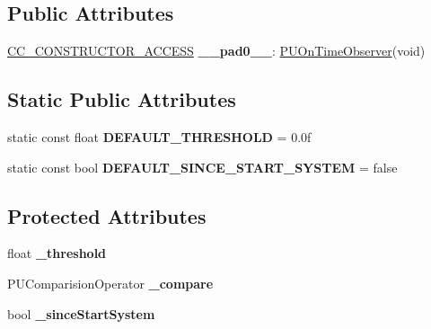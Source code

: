 \subsection*{Public Attributes}
\begin{DoxyCompactItemize}
\item 
\mbox{\label{classPUOnTimeObserver_add5834093bdb7d633b6e162e99235aff}} 
\hyperlink{_2cocos2d_2cocos_2base_2ccConfig_8h_a25ef1314f97c35a2ed3d029b0ead6da0}{C\+C\+\_\+\+C\+O\+N\+S\+T\+R\+U\+C\+T\+O\+R\+\_\+\+A\+C\+C\+E\+SS} {\bfseries \+\_\+\+\_\+pad0\+\_\+\+\_\+}\+: \hyperlink{classPUOnTimeObserver}{P\+U\+On\+Time\+Observer}(void)
\end{DoxyCompactItemize}
\subsection*{Static Public Attributes}
\begin{DoxyCompactItemize}
\item 
\mbox{\label{classPUOnTimeObserver_a234930fd83c32d89a895131cc3e28f1f}} 
static const float {\bfseries D\+E\+F\+A\+U\+L\+T\+\_\+\+T\+H\+R\+E\+S\+H\+O\+LD} = 0.\+0f
\item 
\mbox{\label{classPUOnTimeObserver_ad916ced434b3dabc058efcfd3cb09e2e}} 
static const bool {\bfseries D\+E\+F\+A\+U\+L\+T\+\_\+\+S\+I\+N\+C\+E\+\_\+\+S\+T\+A\+R\+T\+\_\+\+S\+Y\+S\+T\+EM} = false
\end{DoxyCompactItemize}
\subsection*{Protected Attributes}
\begin{DoxyCompactItemize}
\item 
\mbox{\label{classPUOnTimeObserver_aefb3ba7b2347b7cf4465b93d9a1d2550}} 
float {\bfseries \+\_\+threshold}
\item 
\mbox{\label{classPUOnTimeObserver_ab8c38a210d4356f9d174ac5496945bdc}} 
P\+U\+Comparision\+Operator {\bfseries \+\_\+compare}
\item 
\mbox{\label{classPUOnTimeObserver_a6b799fa4bc3843f694018aa7bed442f7}} 
bool {\bfseries \+\_\+since\+Start\+System}
\end{DoxyCompactItemize}
